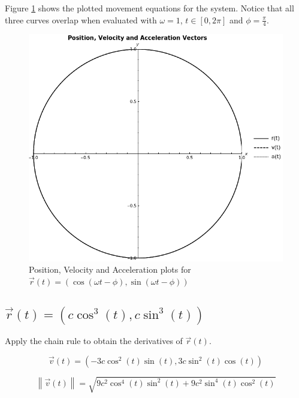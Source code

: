 \documentclass[letterpaper,12pt]{article}
\begin{document}
 Figure \ref{fig: vector 2} shows the plotted movement equations for the 
system. Notice that all three curves overlap when evaluated with $\omega = 1$, 
 $t \in \left [ 0, 2 \pi \right ] $ and $\phi = \frac{\pi}{4}$.
 
 \begin{figure}[h]
 \centering
\includegraphics[scale=0.4,keepaspectratio=true]{./img/graph02.png}
 \caption{Position, Velocity and Acceleration plots for 
$\vec{r}(t) = ( \cos (\omega t - \phi), \sin (\omega t - \phi))$
}
 \label{fig: vector 2}
\end{figure}




\subsection{$\vec{r}(t) = ( c \cos ^3 (t), c \sin ^3 (t))$}

Apply the chain rule to obtain the derivatives of $\vec{r}(t)$.

 \begin{equation*}
  \vec{v}(t) = (- 3 c \cos ^2 (t) \sin (t), 3 c \sin ^ 2 (t) \cos (t))
 \end{equation*}


\begin{equation*}
 \left \| \vec{v}(t) \right \| = \sqrt{ 9 c^2 \cos ^4 (t) \sin^2 (t) + 9 c^2 
\sin ^4 (t) \cos ^2 (t)}
\end{equation*}
\end{document}
